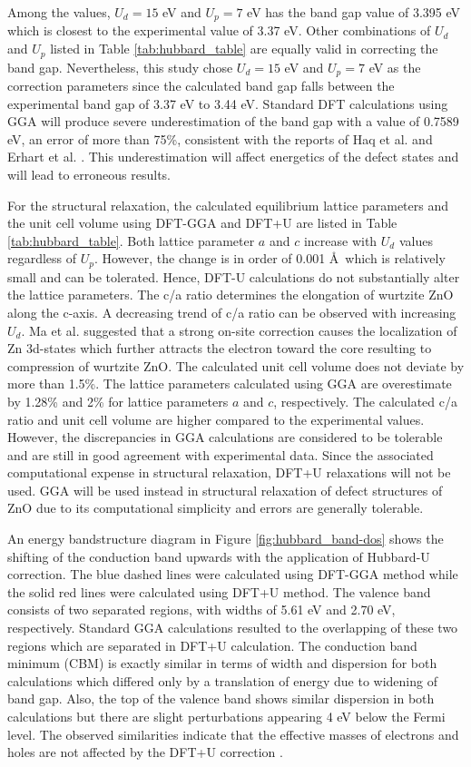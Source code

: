 Among the values, $U_d = 15$ eV and $U_p = 7$ eV has the band gap  value of 3.395 eV which is closest to the experimental value of 3.37 eV. Other combinations of $U_d$ and $U_p$ listed in Table \ref{tab:hubbard_table} are equally valid in correcting the band gap. Nevertheless, this study chose $U_d = 15$ eV and $U_p = 7$ eV as the correction parameters since the calculated band gap falls between the experimental band gap of 3.37 eV to 3.44 eV. Standard DFT calculations using GGA will produce severe underestimation of the band gap with  a value of 0.7589 eV, an error of more than 75\%, consistent with the reports of Haq et al. \citep{Haq2013} and Erhart et al. \citep{Erhart2006a}. This underestimation will affect energetics of the defect states and will lead to erroneous results.

For the structural relaxation, the calculated equilibrium lattice parameters and the unit cell volume  using DFT-GGA and DFT+U are listed in Table \ref{tab:hubbard_table}.  Both lattice parameter $a$ and $c$ increase with $U_d$ values regardless of $U_p$. However, the change is in order of 0.001 \AA \ which is relatively small and can be tolerated. Hence, DFT-U calculations do not substantially alter the lattice parameters. The c/a ratio determines the elongation of wurtzite ZnO along the c-axis. A decreasing trend of c/a ratio can be observed with increasing $U_d$. Ma et al. \citep{Ma2013} suggested that a strong on-site correction causes the localization of Zn 3d-states which further attracts the electron toward the core resulting to  compression of wurtzite ZnO. The calculated unit cell volume does not deviate by more than 1.5\%. The lattice parameters calculated using GGA are overestimate by 1.28\% and 2\% for lattice parameters $a$ and $c$, respectively. The calculated c/a ratio and unit cell volume are higher compared to the experimental values. However, the discrepancies in GGA calculations are considered to be tolerable and are still in good agreement with experimental data. Since the associated computational expense in structural relaxation, DFT+U relaxations will not be used. GGA will be used instead in structural relaxation of defect structures of ZnO  due to its computational simplicity and errors are generally tolerable.

An energy bandstructure diagram in Figure \ref{fig:hubbard_band-dos} shows the shifting of the conduction band upwards with the application of Hubbard-U correction. The blue dashed lines were calculated using DFT-GGA method while the solid red lines were calculated using DFT+U method.   The valence band consists of two separated regions, with widths of 5.61 eV and 2.70 eV, respectively. Standard GGA calculations resulted to the overlapping of these two regions  which are separated in DFT+U calculation. The conduction band minimum (CBM) is exactly similar in terms of width and dispersion for both calculations which differed only by a translation of energy due to widening of band gap. Also, the top of the valence band shows similar dispersion in both calculations but there are slight perturbations appearing 4 eV below the Fermi level. The observed similarities indicate that the effective masses of electrons and holes  are not affected by the DFT+U correction \citep{Goh2017}.

